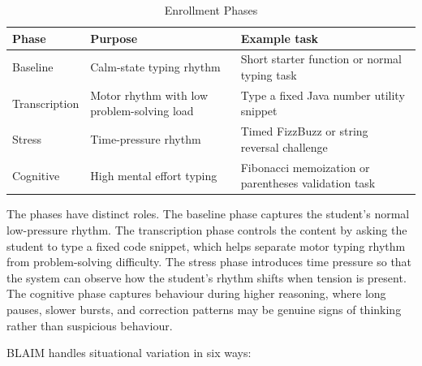 \begin{table}[H]
  \centering
  \caption{Enrollment Phases}
  \label{tab:enrollment-phases}
  \begin{singlespace}
  \begin{tabularx}{\textwidth}{@{}p{2.8cm}p{4.2cm}p{6.0cm}@{}}
    \toprule
    \textbf{Phase} & \textbf{Purpose} & \textbf{Example task} \\
    \midrule
    Baseline & Calm-state typing rhythm & Short starter function or normal typing task \\
    Transcription & Motor rhythm with low problem-solving load & Type a fixed Java number utility snippet \\
    Stress & Time-pressure rhythm & Timed FizzBuzz or string reversal challenge \\
    Cognitive & High mental effort typing & Fibonacci memoization or parentheses validation task \\
    \bottomrule
  \end{tabularx}
  \end{singlespace}
\end{table}

The phases have distinct roles. The baseline phase captures the student's normal low-pressure rhythm. The transcription phase controls the content by asking the student to type a fixed code snippet, which helps separate motor typing rhythm from problem-solving difficulty. The stress phase introduces time pressure so that the system can observe how the student's rhythm shifts when tension is present. The cognitive phase captures behaviour during higher reasoning, where long pauses, slower bursts, and correction patterns may be genuine signs of thinking rather than suspicious behaviour.

BLAIM handles situational variation in six ways:

